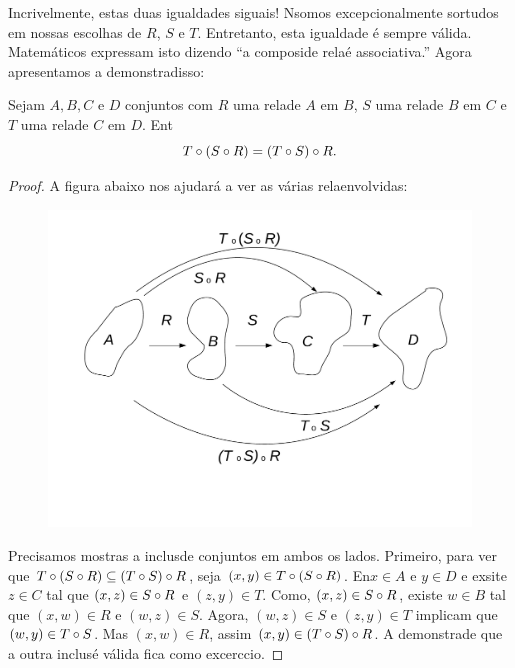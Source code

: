 Incrivelmente, estas duas igualdades s\ao iguais! N\ao somos excepcionalmente sortudos em nossas escolhas de $R$, $S$ e $T$. Entretanto, esta igualdade \'e sempre v\'alida. Matem\'aticos expressam isto dizendo ``a composi\cao de rela\coes \'e associativa.'' Agora apresentamos a demonstra\cao disso:
\begin{teob}\label{relto1}
Sejam $A,B,C$ e $D$ conjuntos com $R$ uma rela\cao de $A$ em $B$, $S$ uma rela\cao de $B$ em $C$ e $T$ uma rela\cao de $C$ em $D$. Ent\ao
\[
T\circ(S\circ R)=(T\circ S)\circ R.
\]
\end{teob}
\begin{proof}
A figura abaixo nos ajudar\'a a ver as v\'arias rela\coes envolvidas:
\begin{figure}[h]
\begin{center}
\includegraphics[width=13cm,trim={1cm 1.5cm 1cm 1.5cm},clip]{./figuras/figure24.pdf}
\end{center}
\end{figure}

Precisamos mostras a inclus\ao de conjuntos em ambos os lados. Primeiro, para ver que $T\circ(S\circ R)\subseteq(T\circ S)\circ R$, seja $(x,y)\in T\circ(S\circ R)$. En\tao $x\in A$ e $y\in D$ e exsite $z\in C$ tal que $(x,z)\in S\circ R$ e $(z,y)\in T$. Como, $(x,z)\in S\circ R$, existe $w\in B$ tal que $(x,w) \in R$ e $(w,z)\in S$. Agora, $(w,z)\in S$ e $(z,y)\in T$ implicam que $(w,y)\in T\circ S$. Mas $(x,w) \in R$, assim $(x,y)\in (T\circ S)\circ R$. A demonstra\cao de que a outra inclus\ao \'e v\'alida fica como excerc\ih cio.
\end{proof}
\\

